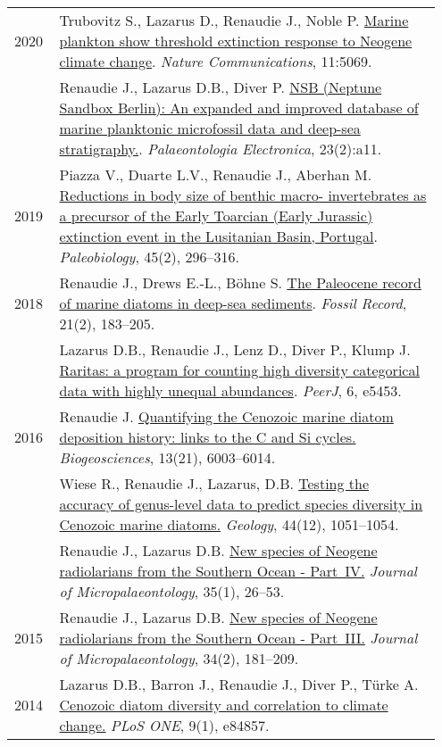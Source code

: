 \documentclass[11pt, a4paper]{article}
\begin{document}
\begin{longtable}{@{}p{0.1\linewidth} P{0.85\linewidth}@{}}
2020 & Trubovitz S., Lazarus D., Renaudie J., Noble P. \href{http://doi.org/10.1038/s41467-020-18879-7}{Marine plankton show threshold extinction response to Neogene climate change}. \textit{Nature Communications}, 11:5069.\\
    & Renaudie J., Lazarus D.B., Diver P. \href{https://palaeo-electronica.org/content/2020/2966-the-nsb-database}{NSB (Neptune Sandbox Berlin): An expanded and improved database of marine planktonic microfossil data and deep-sea stratigraphy.}. \textit{Palaeontologia Electronica}, 23(2):a11.\\
2019 & Piazza V., Duarte L.V., Renaudie J., Aberhan M. \href{http://doi.org/10.1017/pab.2019.11}{Reductions in body size of benthic macro- invertebrates as a precursor of the Early Toarcian (Early Jurassic) extinction event in the Lusitanian Basin, Portugal}. \textit{Paleobiology}, 45(2), 296--316.\\
2018 & Renaudie J., Drews E.-L., B\"{o}hne S. \href{http://dx.doi.org/10.5194/fr-21-183-2018}{The Paleocene record of marine diatoms in deep-sea sediments}. \textit{Fossil Record}, 21(2), 183--205.\\
    & Lazarus D.B., Renaudie J., Lenz D., Diver P., Klump J. \href{http://dx.doi.org/10.7717/peerj.5453}{Raritas: a program for counting high diversity categorical data with highly unequal abundances}. \textit{PeerJ}, 6, e5453.\\
2016 & Renaudie J. \href{http://dx.doi.org/10.5194/bg-13-6003-2016}{Quantifying the Cenozoic marine diatom deposition history: links to the C and Si cycles.} \textit{Biogeosciences}, 13(21), 6003--6014.\\
    & Wiese R., Renaudie J., Lazarus, D.B. \href{http://dx.doi.org/10.1130/G38347.1}{Testing the accuracy of genus-level data to predict species diversity in Cenozoic marine diatoms.} \textit{Geology}, 44(12), 1051--1054.\\
    & Renaudie J., Lazarus D.B. \href{http://dx.doi.org/10.1144/jmpaleo2014-026}{New species of Neogene radiolarians from the Southern Ocean - Part IV.} \textit{Journal of Micropalaeontology}, 35(1), 26--53.\\
2015 & Renaudie J., Lazarus D.B. \href{http://dx.doi.org/10.1144/jmpaleo2013-034}{New species of Neogene radiolarians from the Southern Ocean - Part III.} \textit{Journal of Micropalaeontology}, 34(2), 181--209.\\
2014 & Lazarus D.B., Barron J., Renaudie J., Diver P., Türke A. \href{http://dx.doi.org/10.1371/journal.pone.0084857}{Cenozoic diatom diversity and correlation to climate change.} \textit{PLoS ONE}, 9(1), e84857.\\

\end{longtable}
\end{document}
